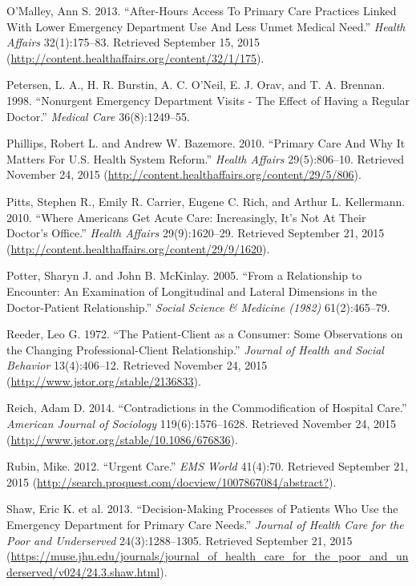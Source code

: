 \documentclass[12pt,twoside]{reedthesis}
\begin{document}
  O'Malley, Ann S. 2013. ``After-Hours Access To Primary Care Practices
  Linked With Lower Emergency Department Use And Less Unmet Medical
  Need.'' \emph{Health Affairs} 32(1):175--83. Retrieved September 15,
  2015 (\url{http://content.healthaffairs.org/content/32/1/175}).
  
  Petersen, L. A., H. R. Burstin, A. C. O'Neil, E. J. Orav, and T. A.
  Brennan. 1998. ``Nonurgent Emergency Department Visits - The Effect of
  Having a Regular Doctor.'' \emph{Medical Care} 36(8):1249--55.
  
  Phillips, Robert L. and Andrew W. Bazemore. 2010. ``Primary Care And Why
  It Matters For U.S. Health System Reform.'' \emph{Health Affairs}
  29(5):806--10. Retrieved November 24, 2015
  (\url{http://content.healthaffairs.org/content/29/5/806}).
  
  Pitts, Stephen R., Emily R. Carrier, Eugene C. Rich, and Arthur L.
  Kellermann. 2010. ``Where Americans Get Acute Care: Increasingly, It's
  Not At Their Doctor's Office.'' \emph{Health Affairs} 29(9):1620--29.
  Retrieved September 21, 2015
  (\url{http://content.healthaffairs.org/content/29/9/1620}).
  
  Potter, Sharyn J. and John B. McKinlay. 2005. ``From a Relationship to
  Encounter: An Examination of Longitudinal and Lateral Dimensions in the
  Doctor-Patient Relationship.'' \emph{Social Science \& Medicine (1982)}
  61(2):465--79.
  
  Reeder, Leo G. 1972. ``The Patient-Client as a Consumer: Some
  Observations on the Changing Professional-Client Relationship.''
  \emph{Journal of Health and Social Behavior} 13(4):406--12. Retrieved
  November 24, 2015 (\url{http://www.jstor.org/stable/2136833}).
  
  Reich, Adam D. 2014. ``Contradictions in the Commodification of Hospital
  Care.'' \emph{American Journal of Sociology} 119(6):1576--1628.
  Retrieved November 24, 2015
  (\url{http://www.jstor.org/stable/10.1086/676836}).
  
  Rubin, Mike. 2012. ``Urgent Care.'' \emph{EMS World} 41(4):70. Retrieved
  September 21, 2015
  (\url{http://search.proquest.com/docview/1007867084/abstract?}).
  
  Shaw, Eric K. et al. 2013. ``Decision-Making Processes of Patients Who
  Use the Emergency Department for Primary Care Needs.'' \emph{Journal of
  Health Care for the Poor and Underserved} 24(3):1288--1305. Retrieved
  September 21, 2015
  (\url{https://muse.jhu.edu/journals/journal_of_health_care_for_the_poor_and_underserved/v024/24.3.shaw.html}).
  
\end{document}
